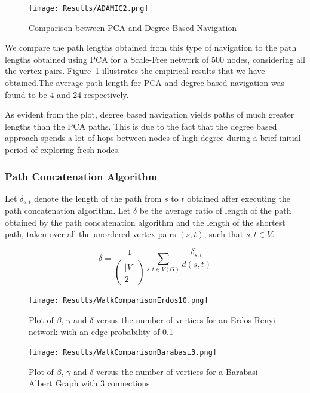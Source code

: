 \documentclass[a4paper,12pt]{article}
\begin{document}
\begin{figure}[htp]
\centering
\texttt{[image: Results/ADAMIC2.png]}
\caption{Comparison between PCA and Degree Based Navigation}
\label{pca_vs_adamics}
\end{figure}

We compare the path lengths obtained from this type of navigation to the path lengths obtained using PCA for a Scale-Free network of 500 nodes, considering all the vertex pairs. Figure~\ref{pca_vs_adamics} illustrates the empirical results that we have obtained.The average path length for PCA and degree based navigation was found to be 4 and 24 respectively.

As evident from the plot, degree based navigation yields paths of much greater lengths than the PCA paths. 
This is due to the fact that the degree based approach spends a lot of hops between nodes of high degree during a brief initial period of exploring fresh nodes. 

\subsubsection{Path Concatenation Algorithm}
Let $\delta_{s,t}$ denote the length of the path from $s$ to $t$ obtained after 
executing the path concatenation algorithm. Let $\delta$ be the average ratio of 
length of the path obtained by the path concatenation algorithm and the length 
of the shortest path, taken over all the unordered vertex pairs $(s,t)$, such 
that $s,t \in V$.

$$\delta = \frac{1}{\left(\begin{array}{c} |V|\\ 2\end{array}\right)} 
\sum_{s,t \in V(G)} \frac{\delta_{s,t}}{d(s,t)}$$


\begin{figure}[htp!]
\centering
\texttt{[image: Results/WalkComparisonErdos10.png]}
\caption{Plot of $\beta$, $\gamma$ and $\delta$ 
versus the number of vertices for an Erdos-Renyi network with an edge probability of 0.1}
\label{4_performance_er}
\end{figure}

\begin{figure}[htp!]
\centering
\texttt{[image: Results/WalkComparisonBarabasi3.png]}
\caption{Plot of $\beta$, $\gamma$ and $\delta$ versus the number
of vertices for a Barabasi-Albert Graph with 3 connections}
\label{4_performance_ba}
\end{figure}
\end{document}
